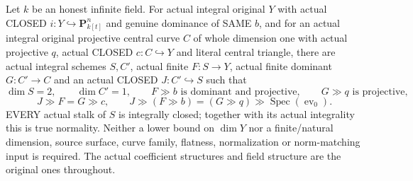 \begin{theorem}
\label{thm:pl-gauss-original-normal-horizontal-finite-surface}
\leanok
Let $k$ be an honest infinite field. For actual integral original $Y$
with actual CLOSED $i:Y\hookrightarrow\mathbf P^n_{k[t]}$ and genuine
dominance of SAME $b$, and for an actual integral original projective
central curve $C$ of whole dimension one with actual projective $q$,
actual CLOSED $c:C\hookrightarrow Y$ and literal central triangle,
there are actual integral schemes $S,C'$, actual finite $F:S\to Y$,
actual finite dominant $G:C'\to C$ and an actual CLOSED
$J:C'\hookrightarrow S$ such that
\[
 \dim S=2,\qquad \dim C'=1,\qquad
 F\gg b\text{ is dominant and projective},\qquad
 G\gg q\text{ is projective},
\]
\[
 J\gg F=G\gg c,\qquad
 J\gg(F\gg b)=(G\gg q)\gg\operatorname{Spec}(\operatorname{ev}_0).
\]
EVERY actual stalk of $S$ is integrally closed; together with its actual
integrality this is true normality. Neither a lower bound on $\dim Y$
nor a finite/natural dimension, source surface, curve family, flatness,
normalization or norm-matching input is required. The actual coefficient
structures and field structure are the original ones throughout.
\end{theorem}
